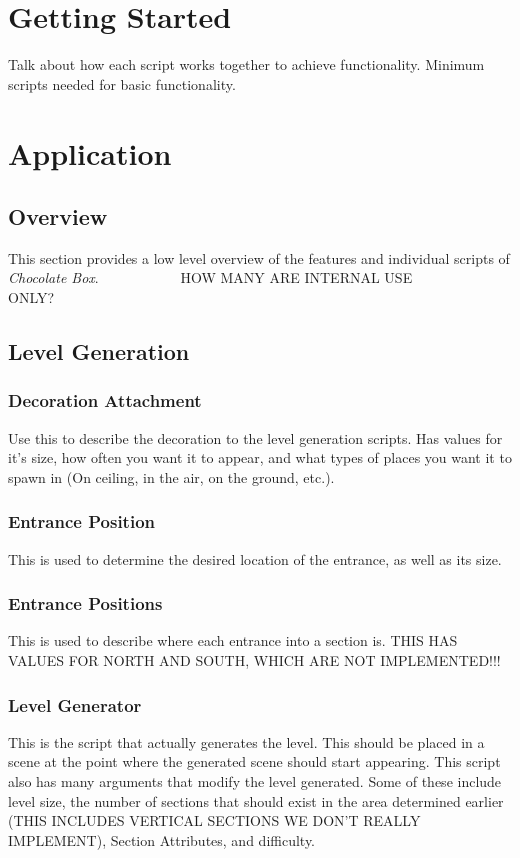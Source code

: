 \documentclass[pdftex,12pt,letter]{article}
\begin{document}
\section{Getting Started}
Talk about how each script works together to achieve functionality.
Minimum scripts needed for basic functionality.

\section{Application}
\subsection{Overview}
This section provides a low level overview of the features and individual scripts of \textit{Chocolate Box}.
~~~~~~~~~~~HOW MANY ARE INTERNAL USE ONLY?~~~~~~~~~~~~
\subsection{Level Generation}
\subsubsection{Decoration Attachment}
Use this to describe the decoration to the level generation scripts. Has values for it's size, how often you want it to appear, and what types of places you want it to spawn in (On ceiling, in the air, on the ground, etc.).
\subsubsection{Entrance Position}
This is used to determine the desired location of the entrance, as well as its size.
\subsubsection{Entrance Positions}
This is used to describe where each entrance into a section is. THIS HAS VALUES FOR NORTH AND SOUTH, WHICH ARE NOT IMPLEMENTED!!!
\subsubsection{Level Generator}
This is the script that actually generates the level. This should be placed in a scene at the point where the generated scene should start appearing. This script also has many arguments that modify the level generated. Some of these include level size, the number of sections that should exist in the area determined earlier (THIS INCLUDES VERTICAL SECTIONS WE DON'T REALLY IMPLEMENT), Section Attributes, and difficulty. 
\end{document}
